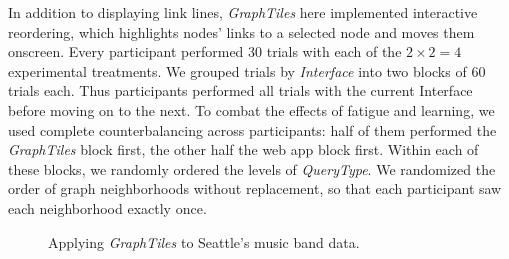 \documentclass{sigchi}
\begin{document}
In addition to displaying link lines, \textit{GraphTiles} here implemented interactive reordering, which highlights nodes' links to a selected node and moves them onscreen. Every participant performed $30$ trials with each of the $2 \times 2 = 4$ experimental treatments. We grouped trials by \textit{Interface} into two blocks of $60$ trials each. Thus participants performed all trials with the current Interface before moving on to the next. To combat the effects of fatigue and learning, we used complete counterbalancing across participants: half of them performed the \textit{GraphTiles} block first, the other half the web app block first. Within each of these blocks, we randomly ordered the levels of \textit{QueryType}. We randomized the order of graph neighborhoods without replacement, so that each participant saw each neighborhood exactly once.

\begin{figure}[t]
\centering
{}
\caption{Applying \textit{GraphTiles} to Seattle's music band data.}
\label{fig:musicband}
\end{figure}
\end{document}
